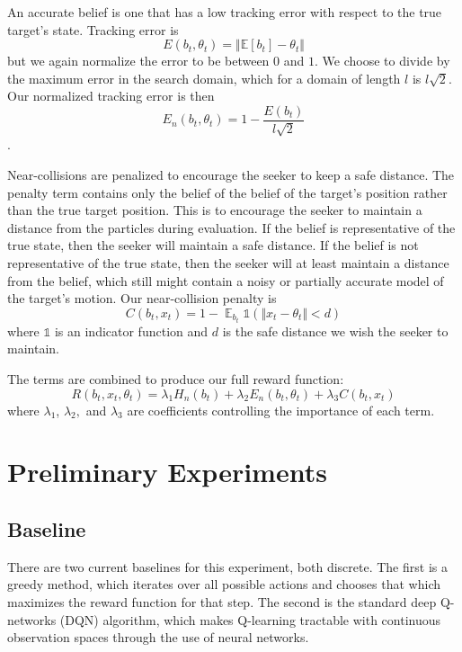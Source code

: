 \documentclass[10pt,twocolumn,letterpaper]{article}
\begin{document}
An accurate belief is one that has a low tracking error with respect to the true target's state.
Tracking error is
\begin{equation}
E(b_t, \theta_t) = \Vert \mathbb{E}{[ b_t ]} - \theta_t \Vert
\label{tracking_unnormalized}
\end{equation}
but we again normalize the error to be between $0$ and $1$.
We choose to divide by the maximum error in the search domain, which for a domain of length $l$ is $l\sqrt{2}$.
Our normalized tracking error is then
\begin{equation}
E_{n}(b_t, \theta_t) = 1 - \frac{E(b_t)}{l\sqrt{2}}
\label{tracking_normalized}
\end{equation}.

Near-collisions are penalized to encourage the seeker to keep a safe distance.
The penalty term contains only the belief of the belief of the target's position rather than the true target position.
This is to encourage the seeker to maintain a distance from the particles during evaluation.
If the belief is representative of the true state, then the seeker will maintain a safe distance.
If the belief is not representative of the true state, then the seeker will at least maintain a distance from the belief, which still might contain a noisy or partially accurate model of the target's motion.
Our near-collision penalty is
\begin{equation}
C(b_t, x_t) = 1 - \mathop{{}\mathbb{E}}_{b_t} \mathds{1} (\Vert x_t - \theta_t\Vert < d)
\label{collision_penalty}
\end{equation}
where $\mathds{1}$ is an indicator function and $d$ is the safe distance we wish the seeker to maintain.

The terms are combined to produce our full reward function:
\begin{equation}
R(b_t, x_t, \theta_t) = \lambda_1 H_{n}(b_t) + \lambda_2 E_{n}(b_t, \theta_t) + \lambda_3 C(b_t, x_t)
\label{reward_function}
\end{equation}
where $\lambda_1$, $\lambda_2,$ and $\lambda_3$ are coefficients controlling the importance of each term.

\section{Preliminary Experiments}

\subsection{Baseline}
There are two current baselines for this experiment, both discrete.
The first is a greedy method, which iterates over all possible actions and chooses that which maximizes the reward function for that step.
The second is the standard deep Q-networks (DQN) algorithm, which makes Q-learning tractable with continuous observation spaces through the use of neural networks.
\end{document}
